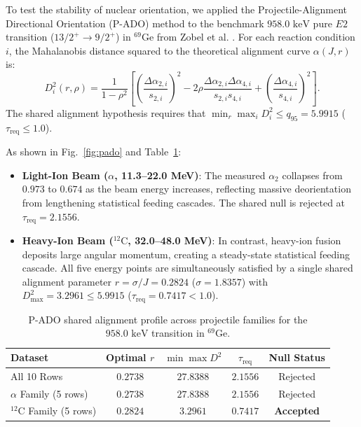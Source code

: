 \documentclass[aps,prc,twocolumn,showpacs,superscriptaddress,floatfix,nofootinbib]{revtex4-2}
\begin{document}
To test the stability of nuclear orientation, we applied the Projectile-Alignment Directional Orientation (P-ADO) method to the benchmark $958.0\text{ keV}$ pure $E2$ transition ($13/2^+ \to 9/2^+$) in $^{69}\text{Ge}$ from Zobel et al. \cite{Zobel1983}. For each reaction condition $i$, the Mahalanobis distance squared to the theoretical alignment curve $\alpha(J, r)$ is:
\begin{equation}
    D_i^2(r, \rho) = \frac{1}{1 - \rho^2} \left[ \left(\frac{\Delta\alpha_{2,i}}{s_{2,i}}\right)^2 - 2\rho \frac{\Delta\alpha_{2,i} \Delta\alpha_{4,i}}{s_{2,i} s_{4,i}} + \left(\frac{\Delta\alpha_{4,i}}{s_{4,i}}\right)^2 \right].
    \label{eq:mahalanobis}
\end{equation}
The shared alignment hypothesis requires that $\min_r \max_i D_i^2 \le q_{95} = 5.9915$ ($\tau_{\text{req}} \le 1.0$).

As shown in Fig.~\ref{fig:pado} and Table~\ref{tab:pado}:
\begin{itemize}
    \item \textbf{Light-Ion Beam ($\alpha$, 11.3--22.0 MeV)}: The measured $\alpha_2$ collapses from $0.973$ to $0.674$ as the beam energy increases, reflecting massive deorientation from lengthening statistical feeding cascades. The shared null is rejected at $\tau_{\text{req}} = 2.1556$.
    \item \textbf{Heavy-Ion Beam ($^{12}\text{C}$, 32.0--48.0 MeV)}: In contrast, heavy-ion fusion deposits large angular momentum, creating a steady-state statistical feeding cascade. All five energy points are simultaneously satisfied by a single shared alignment parameter $r = \sigma/J = 0.2824$ ($\sigma = 1.8357$) with $D_{\max}^2 = 3.2961 \le 5.9915$ ($\tau_{\text{req}} = 0.7417 < 1.0$).
\end{itemize}

\begin{table}[h]
\caption{P-ADO shared alignment profile across projectile families for the $958.0\text{ keV}$ transition in $^{69}\text{Ge}$.}
\label{tab:pado}
\begin{ruledtabular}
\begin{tabular}{lcccc}
Dataset & Optimal $r$ & $\min\max D^2$ & $\tau_{\text{req}}$ & Null Status \\
\hline
All 10 Rows & $0.2738$ & $27.8388$ & $2.1556$ & Rejected \\
$\alpha$ Family (5 rows) & $0.2738$ & $27.8388$ & $2.1556$ & Rejected \\
$^{12}\text{C}$ Family (5 rows) & $0.2824$ & $3.2961$ & $0.7417$ & \textbf{Accepted} \\
\end{tabular}
\end{ruledtabular}
\end{table}
\end{document}
